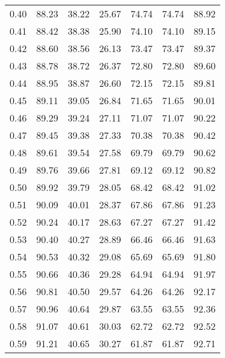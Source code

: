 \begin{tabular}{|c|c|c|c|c|c|c|}
      0.40 &     88.23 &     38.22 &      25.67 &   74.74 &      74.74 &         88.92 \\
      0.41 &     88.42 &     38.38 &      25.90 &   74.10 &      74.10 &         89.15 \\
      0.42 &     88.60 &     38.56 &      26.13 &   73.47 &      73.47 &         89.37 \\
      0.43 &     88.78 &     38.72 &      26.37 &   72.80 &      72.80 &         89.60 \\
      0.44 &     88.95 &     38.87 &      26.60 &   72.15 &      72.15 &         89.81 \\
      0.45 &     89.11 &     39.05 &      26.84 &   71.65 &      71.65 &         90.01 \\
      0.46 &     89.29 &     39.24 &      27.11 &   71.07 &      71.07 &         90.22 \\
      0.47 &     89.45 &     39.38 &      27.33 &   70.38 &      70.38 &         90.42 \\
      0.48 &     89.61 &     39.54 &      27.58 &   69.79 &      69.79 &         90.62 \\
      0.49 &     89.76 &     39.66 &      27.81 &   69.12 &      69.12 &         90.82 \\
      0.50 &     89.92 &     39.79 &      28.05 &   68.42 &      68.42 &         91.02 \\
      0.51 &     90.09 &     40.01 &      28.37 &   67.86 &      67.86 &         91.23 \\
      0.52 &     90.24 &     40.17 &      28.63 &   67.27 &      67.27 &         91.42 \\
      0.53 &     90.40 &     40.27 &      28.89 &   66.46 &      66.46 &         91.63 \\
      0.54 &     90.53 &     40.32 &      29.08 &   65.69 &      65.69 &         91.80 \\
      0.55 &     90.66 &     40.36 &      29.28 &   64.94 &      64.94 &         91.97 \\
      0.56 &     90.81 &     40.50 &      29.57 &   64.26 &      64.26 &         92.17 \\
      0.57 &     90.96 &     40.64 &      29.87 &   63.55 &      63.55 &         92.36 \\
      0.58 &     91.07 &     40.61 &      30.03 &   62.72 &      62.72 &         92.52 \\
      0.59 &     91.21 &     40.65 &      30.27 &   61.87 &      61.87 &         92.71 \\

\end{tabular}
